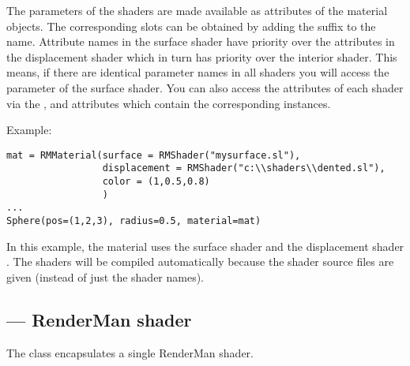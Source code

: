 The parameters of the shaders are made available as attributes of the
material objects. The corresponding slots can be obtained by adding
the suffix  to the name. Attribute names in the surface shader
have priority over the attributes in the displacement shader which in
turn has priority over the interior shader. This means, if there are
identical parameter names in all shaders you will access the parameter
of the surface shader. You can also access the attributes of each
shader via the ,  and 
attributes which contain the corresponding  instances.

Example:
   
\begin{verbatim}
mat = RMMaterial(surface = RMShader("mysurface.sl"),
                 displacement = RMShader("c:\\shaders\\dented.sl"),
                 color = (1,0.5,0.8)
                 )
...
Sphere(pos=(1,2,3), radius=0.5, material=mat)
\end{verbatim}

In this example, the material uses the surface shader 
and the displacement shader . The shaders will
be compiled automatically because the shader source files are given
(instead of just the shader names).

\subsection{ ---  RenderMan shader}
\label{rmshader}

The  class encapsulates a single RenderMan shader.

